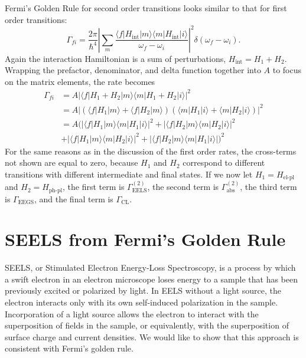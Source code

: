 \documentclass [11pt, proquest] {uwthesis}[2016/11/22]
\begin{document}
Fermi's Golden Rule for second order transitions looks similar to that for first order transitions:
\begin{equation}
\Gamma_{fi} = \frac{2\pi}{\hbar^4}\left|\sum_{m}\frac{\langle f |H_{\textrm{int}}| m \rangle \langle m |H_{\textrm{int}}| i \rangle }{\omega_f-\omega_i}\right|^2 \delta(\omega_f - \omega_i).
\label{FGR_2}
\end{equation}
Again the interaction Hamiltonian is a sum of perturbations, $H_{\textrm{int}} = H_1 + H_2$. Wrapping the prefactor, denominator, and delta function together into $A$ to focus on the matrix elements, the rate becomes
\begin{equation}
\begin{aligned}
\Gamma_{fi} &= A|\langle f |H_1 + H_2| m \rangle \langle m |H_1 + H_2| i \rangle|^2\\
&= A|(\langle f |H_1| m \rangle + \langle f |H_2| m \rangle) (\langle m |H_1| i \rangle + \langle m |H_2| i \rangle)|^2\\
&= A(|\langle f |H_1| m \rangle \langle m |H_1| i \rangle|^2 + |\langle f |H_2| m \rangle \langle m |H_2| i \rangle|^2\\
&+ |\langle f |H_1| m \rangle \langle m |H_2| i \rangle|^2 + |\langle f |H_2| m \rangle \langle m |H_1| i \rangle|)^2
\label{FGR_2_2}
\end{aligned}
\end{equation}
For the same reasons as in the discussion of the first order rates, the cross-terms not shown are equal to zero, because $H_1$ and $H_2$ correspond to different transitions with different intermediate and final states. If we now let $H_1 = H_\textrm{el-pl}$ and $H_2 = H_{\textrm{ph-pl}}$, the first term is $\Gamma_{\textrm{EELS}}^{(2)}$, the second term is $\Gamma_{\textrm{abs}}^{(2)}$, the third term is $\Gamma_{\textrm{EEGS}}$, and the final term is $\Gamma_{\textrm{CL}}$.

\section{SEELS from Fermi's Golden Rule}
SEELS, or Stimulated Electron Energy-Loss Spectroscopy, is a process by which a swift electron in an electron microscope loses energy to a sample that has been previously excited or polarized by light. In EELS without a light source, the electron interacts only with its own self-induced polarization in the sample. Incorporation of a light source allows the electron to interact with the superposition of fields in the sample, or equivalently, with the superposition of surface charge and current densities. We would like to show that this approach is consistent with Fermi's golden rule\cite{vanAiken,EEGS}.
\end{document}
